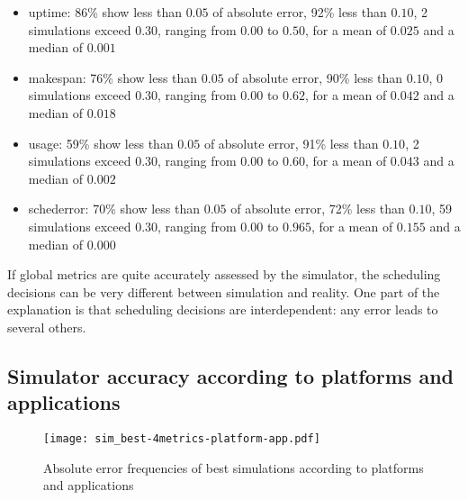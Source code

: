 \begin{itemize}
 \item uptime: 
      86\% show less than $0.05$ of absolute error, 
      92\% less than $0.10$, 
      2 simulations exceed $0.30$,
      ranging from $0.00$ to $0.50$, for a mean of $0.025$ and a median of $0.001$
 \item makespan: 
      76\% show less than $0.05$ of absolute error, 
      90\% less than $0.10$, 
      0 simulations exceed $0.30$,
      ranging from $0.00$ to $0.62$, for a mean of $0.042$ and a median of $0.018$
 \item usage: 
      59\% show less than $0.05$ of absolute error, 
      91\% less than $0.10$, 
      2 simulations exceed $0.30$,
      ranging from $0.00$ to $0.60$, for a mean of $0.043$ and a median of $0.002$
 \item schederror: 
      70\% show less than $0.05$ of absolute error, 
      72\% less than $0.10$, 
      59 simulations exceed $0.30$,
      ranging from $0.00$ to $0.965$, for a mean of $0.155$ and a median of $0.000$
\end{itemize}

If global metrics are quite accurately assessed by the simulator, 
the scheduling decisions can be very different between simulation and reality. 
One part of the explanation is that scheduling decisions are interdependent: 
any error leads to several others.


\subsection{Simulator accuracy according to platforms and applications}


\begin{figure}
  \texttt{[image: sim\_best-4metrics-platform-app.pdf]}
\caption{Absolute error frequencies of best simulations according to platforms 
and applications}
\end{figure} 

